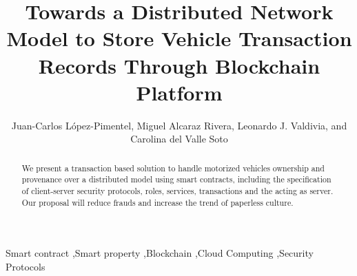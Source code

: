 \begin{frontmatter}






\title{Towards a Distributed Network Model to Store Vehicle Transaction Records Through Blockchain Platform}

\author{Juan-Carlos L\'opez-Pimentel,
        Miguel Alcaraz Rivera,
        Leonardo J. Valdivia,
        and Carolina del Valle Soto%
}

\address{}

\begin{abstract}
We present a transaction based solution to handle motorized vehicles ownership 
and provenance over a distributed model using smart contracts,  
including the specification of client-server security protocols,
roles, services, transactions and the \blockchaincarnetwork acting as server.
Our proposal will reduce frauds and increase the trend of paperless culture.
\end{abstract}

\begin{keyword}
Smart contract 
\sep Smart property
\sep Blockchain
\sep Cloud Computing
\sep Security Protocols


\end{keyword}

\end{frontmatter}
